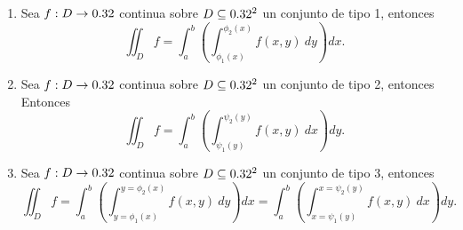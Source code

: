 \begin{propertie} \label{col:fubini}
   
    \begin{enumerate}
        \item  Sea $f:D\to0.32$ continua sobre  $D\subseteq0.32^2$  un conjunto de tipo 1, entonces
        \[
            \iint_D f=\int_a^b\left(\int_{\phi_1(x)}^{\phi_2(x)}f(x,y)\:dy\right)dx.  
        \]
        \item  Sea $f:D\to0.32$ continua sobre  $D\subseteq0.32^2$  un conjunto de tipo 2, entonces
        Entonces
        \[
            \iint_D f=\int_a^b\left(\int_{\psi_1(y)}^{\psi_2(y)}f(x,y)\:dx\right)dy.  
        \]
        \item  Sea $f:D\to0.32$ continua sobre  $D\subseteq0.32^2$  un conjunto de tipo 3, entonces
        \[
            \iint_D f=\int_a^b\left(\int_{y=\phi_1(x)}^{y=\phi_2(x)}f(x,y)\:dy\right)dx=\int_a^b\left(\int_{x=\psi_1(y)}^{x=\psi_2(y)}f(x,y)\:dx\right)dy. 
        \]
    \end{enumerate}
\end{propertie}
